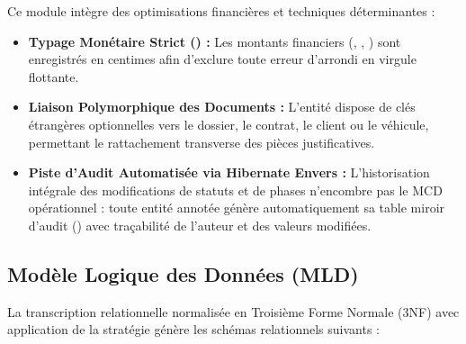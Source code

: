 Ce module intègre des optimisations financières et techniques déterminantes :
\begin{itemize}
    \item \textbf{Typage Monétaire Strict () :} Les montants financiers (, , ) sont enregistrés en centimes afin d'exclure toute erreur d'arrondi en virgule flottante.
    \item \textbf{Liaison Polymorphique des Documents :} L'entité  dispose de clés étrangères optionnelles vers le dossier, le contrat, le client ou le véhicule, permettant le rattachement transverse des pièces justificatives.
    \item \textbf{Piste d'Audit Automatisée via Hibernate Envers :} L'historisation intégrale des modifications de statuts et de phases n'encombre pas le MCD opérationnel : toute entité annotée  génère automatiquement sa table miroir d'audit () avec traçabilité de l'auteur et des valeurs modifiées.
\end{itemize}

\subsection{Modèle Logique des Données (MLD)}

La transcription relationnelle normalisée en Troisième Forme Normale (3NF) avec application de la stratégie  génère les schémas relationnels suivants :

